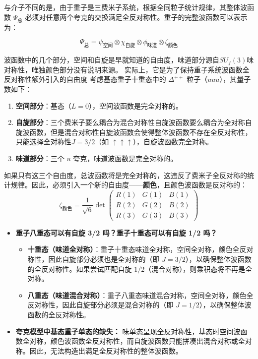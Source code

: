 \begin{derivationnote}[重子波函数的全反对称性和颜色自由度]

与介子不同的是，由于重子是三费米子系统，根据全同粒子统计规律，其整体波函数 $\Psi_{\text{总}}$ 必须对任意两个夸克的交换满足全反对称性。重子的完整波函数可以表示为：

$$\Psi_{\text{总}} = \psi_{\text{空间}} \otimes \chi_{\text{自旋}} \otimes \phi_{\text{味道}} \otimes \zeta_{\text{颜色}}$$

波函数中的几个部分，空间和自旋是早就知道的自由度，味道部分源自$SU_f(3)$味对称性，唯独颜色部分没有说明来源。
实际上，它是为了保持重子系统波函数全反对称性额外引入的自由度
考虑基态重子十重态中的 $\Delta^{++}$ 粒子（$uuu$），其量子数如下：
    \begin{enumerate}
        \item \textbf{空间部分}：基态（$L=0$），空间波函数是完全对称的。
        \item \textbf{自旋部分}：三个费米子要么耦合为混合对称性自旋波函数要么耦合为全对称自旋波函数，但是混合对称性自旋波函数会使得整体波函数不存在全反对称性，只能选择全对称性$J=3/2$（如 $\uparrow\uparrow\uparrow$），自旋波函数完全对称。
        \item \textbf{味道部分}：三个 $u$ 夸克，味道波函数是完全对称的。
    \end{enumerate}
    如果只有这三个自由度，总波函数将是完全对称的，这违反了费米子全反对称的统计规律。因此，必须引入一个新的自由度——\textbf{颜色}，且颜色波函数是反对称的：
    $$\zeta_{\text{颜色}} = \frac{1}{\sqrt{6}} \det \begin{pmatrix} R(1) & G(1) & B(1) \\ R(2) & G(2) & B(2) \\ R(3) & G(3) & B(3) \end{pmatrix}$$
\begin{itemize}
    \item \textbf{重子八重态可以有自旋 3/2 吗？重子十重态可以有自旋 1/2 吗？}
    \begin{itemize}
        \item \textbf{十重态（味道全对称）}：重子十重态味道全对称，空间全对称，颜色全反对称性，因此自旋部分必须也是全对称的（即 $J=3/2$），以确保整体波函数的全反对称性。如果尝试匹配自旋 $1/2$（混合对称），则乘积态将不再是全对称。
        \item \textbf{八重态（味道混合对称）}：重子八重态味道混合对称，空间全对称，颜色全反对称性，因此自旋部分必须是混合对称的（即 $J=1/2$），以确保整体波函数的全反对称性。
    \end{itemize}
    \item \textbf{夸克模型中基态重子单态的缺失：}
    味单态呈现全反对称性，基态时空间波函数全对称，颜色波函数全反对称性，而自旋波函数只能拼凑出混合对称或全对称。因此，无法构造出满足全反对称性的整体波函数。
\end{itemize}
\end{derivationnote}
